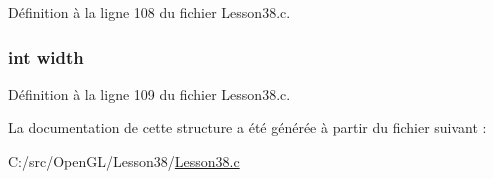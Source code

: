 Définition à la ligne 108 du fichier Lesson38.\+c.

\subsubsection[{\texorpdfstring{width}{width}}]{\setlength{\rightskip}{0pt plus 5cm}int width}\hypertarget{struct_g_l___window_init_a2474a5474cbff19523a51eb1de01cda4}{}\label{struct_g_l___window_init_a2474a5474cbff19523a51eb1de01cda4}


Définition à la ligne 109 du fichier Lesson38.\+c.



La documentation de cette structure a été générée à partir du fichier suivant \+:\begin{DoxyCompactItemize}
\item 
C\+:/src/\+Open\+G\+L/\+Lesson38/\hyperlink{_lesson38_8c}{Lesson38.\+c}\end{DoxyCompactItemize}
